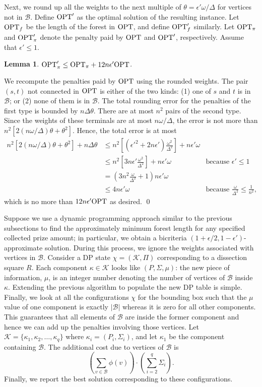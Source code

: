 \documentclass[extras,11pt]{article} \usepackage{fullpage}
\theoremstyle{mytheorem}
\newtheorem{lemma}[theorem]{Lemma}
\renewenvironment{proof}{\par\noindent{\bf Proof.}\hspace{0.5em}}
    {\hfill\qed\vspace{1ex}}
\newcommand{\eps}{\epsilon}
\newcommand{\K}{\mathcal{K}}
\newcommand{\B}{\mathcal{B}}
\newcommand{\OPT}{\mbox{\rm OPT}}
\begin{document}
Next, we round up all the weights to the next multiple of $\theta=\eps' \omega/\Delta$
for vertices not in $\B$.
 Define $\OPT'$ as the optimal solution of the resulting instance.
 Let $\OPT_f$ be the length of the forest in $\OPT$, and define $\OPT'_f$ similarly.
 Let $\OPT_\pi$ and $\OPT'_\pi$ denote the penalty paid by $\OPT$ and $\OPT'$, respectively.
Assume that $\eps' \leq 1$.
\begin{lemma}\label{lem:round-err}
$\OPT'_\pi \leq \OPT_\pi +12n\eps'\OPT$.
\end{lemma}
\begin{proof} We recompute the penalties paid by $\OPT$
 using the rounded weights.
 The pair $(s,t)$ not connected in $\OPT$  is either of the two kinds:
 (1) one of $s$ and $t$ is in $\B$; or (2) none of them is in $\B$.
 The total rounding error for the penalties of the first type is bounded by
 $n\Delta\theta$.
 There are at most $n^2$ pairs of the second type.
  Since the weights of these terminals are at most $n\omega/\Delta$,
 the error is not more than $n^2[2(n\omega/\Delta)\theta + \theta^2]$.
 Hence, the total error is at most
\begin{align*}
       n^2[2(n\omega/\Delta)\theta + \theta^2] +  n\Delta\theta
&\leq   n^2\left[(\eps'^2 + 2n\eps')\frac{\omega^2}{\Delta^2}\right] +  n\eps'\omega \\
&\leq   n^2\left[3n\eps'\frac{\omega^2}{\Delta^2}\right] +  n\eps'\omega & \text{because $\eps' \leq 1$}\\
&=      \left(3n^2\frac{\omega}{\Delta^2} + 1\right)  n\eps'\omega \\
&\leq   4n\eps'\omega  &\text{because $\frac{\omega}{\Delta^2}\leq \frac{1}{n^2}$},
\end{align*}
which is no more than $12n\eps'\OPT$ as desired.
\end{proof}






Suppose we use a dynamic programming approach similar to the previous subsections
to find the approximately minimum forest length for any specified collected prize amount;
in particular, we obtain a bicriteria $(1+\eps/2, 1-\eps')$-approximate solution.
During this process, we ignore the weights associated with vertices in $\B$.
Consider a DP state $\chi=(\K, \Pi)$ corresponding to a dissection square $R$.
Each component $\kappa\in\K$ looks like  $(P, \Sigma, \mu)$:
the new piece of information, $\mu$, is an integer number denoting the number of
vertices of $\B$ inside $\kappa$.
Extending the previous algorithm to populate the new DP table is simple.
Finally, we look at all the configurations $\chi$ for the bounding box such that
the $\mu$ value of one component is exactly $|\B|$ whereas it is zero for all other components.
This guarantees that all elements of $\B$ are inside the former component and hence
we can add up the penalties involving those vertices.
Let $\K=\{\kappa_1, \kappa_2, \dots, \kappa_q\}$ where $\kappa_i=(P_i,\Sigma_i)$,
and let $\kappa_1$ be the component containing $\B$.
The additional cost due to vertices of $\B$ is
$$\left(\sum_{v\in\B}\phi(v)\right)\cdot\left(\sum_{i=2}^{q}\Sigma_i\right).$$
Finally, we report the best solution corresponding to these configurations.
\end{document}
